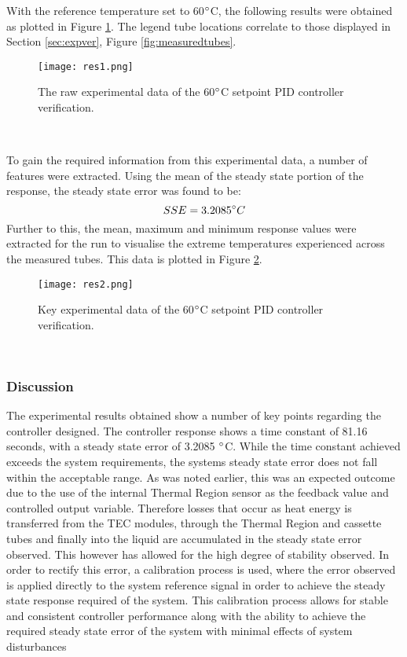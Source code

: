  With the reference temperature set to 60$\degree$C, the following results were obtained as plotted in Figure \ref{fig:res1}. The legend tube locations correlate to those displayed in Section \ref{sec:expver}, Figure \ref{fig:measuredtubes}. 
 
\begin{figure}[!htb]
	\centering
	\texttt{[image: res1.png]}
	\caption[Temperature Sensor Data - 60$\degree$C Setpoint.]{The raw experimental data of the 60$\degree$C setpoint PID controller verification.}
	\label{fig:res1}
\end{figure} 
\FloatBarrier

To gain the required information from this experimental data, a number of features were extracted. Using the mean of the steady state portion of the response, the steady state error was found to be: 
$$ SSE = 3.2085\degree C$$
Further to this, the mean, maximum and minimum response values were extracted for the run to visualise the extreme temperatures experienced across the measured tubes. This data is plotted in Figure \ref{fig:res2}.

\begin{figure}[!htb]
	\centering
	\texttt{[image: res2.png]}
	\caption[Temperature Sensor Data Key Values - 60$\degree$C Setpoint.]{Key experimental data of the 60$\degree$C setpoint PID controller verification.}
	\label{fig:res2}
\end{figure} 
\FloatBarrier

\subsubsection{Discussion}

The experimental results obtained show a number of key points regarding the controller designed. The controller response shows a time constant of 81.16 seconds, with a steady state error of 3.2085 $\degree$C. While the time constant achieved exceeds the system requirements, the systems steady state error does not fall within the acceptable range. As was noted earlier, this was an expected outcome due to the use of the internal Thermal Region sensor as the feedback value and controlled output variable. Therefore losses that occur as heat energy is transferred from the TEC modules, through the Thermal Region and cassette tubes and finally into the liquid are accumulated in the steady state error observed. This however has allowed for the high degree of stability observed. In order to rectify this error, a calibration process is used, where the error observed is applied directly to the system reference signal in order to achieve the steady state response required of the system. This calibration process allows for stable and consistent controller performance along with the ability to achieve the required steady state error of the system with minimal effects of system disturbances 


